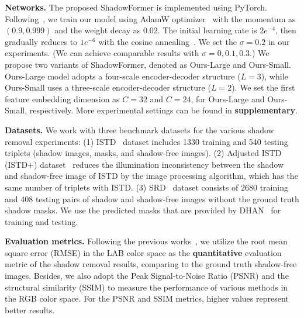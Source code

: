 \documentclass[letterpaper]{article} \usepackage{aaai23}  \usepackage{times}  \usepackage{helvet}  \usepackage{courier}  \usepackage[hyphens]{url}  \usepackage{graphicx} \urlstyle{rm} \def\UrlFont{\rm}  \usepackage{natbib}  \usepackage{caption} \frenchspacing  \setlength{\pdfpagewidth}{8.5in} \setlength{\pdfpageheight}{11in} \usepackage{algorithm}
\begin{document}
\noindent\textbf{Networks.}
The proposed ShadowFormer is implemented using PyTorch.
{Following~\cite{vaswani2017attention},  
we train our model using AdamW optimizer~\cite{loshchilov2017decoupled} with the momentum as $(0.9, 0.999)$ and the weight decay as $0.02$.}
{The initial learning rate is $2e^{-4}$, then gradually reduces to $1e^{-6}$ with the cosine annealing~\cite{loshchilov2016sgdr}.}
We set the $\sigma=0.2$ in our experiments. (We can achieve comparable results with $\sigma=0, 0.1, 0.3$.)
{We propose two variants of ShadowFormer, 
denoted as Ours-Large and Ours-Small.}
{Ours-Large model adopts a four-scale encoder-decoder structure ($L=3$), while Ours-Small uses a three-scale encoder-decoder structure ($L=2$).
}
We set the first feature embedding dimension as $C=32$ and $C=24$, for Ours-Large and Ours-Small, respectively.
More experimental settings can be found in \textbf{supplementary}.

\noindent\textbf{Datasets.} 
{We work with three benchmark datasets for the various shadow removal experiments: }
(1) ISTD~\cite{wang2018stacked} dataset includes 1330 training and 540 testing triplets (shadow images, masks, and shadow-free images).
(2) Adjusted ISTD (ISTD+) dataset~\cite{le2019shadow} reduces the illumination inconsistency between the shadow and shadow-free image of ISTD 
by the image processing algorithm, which has the same number of triplets with ISTD.
(3) SRD~\cite{qu2017deshadownet} dataset consists of 2680 training and 408 testing pairs of shadow and shadow-free images without the ground truth shadow masks.
We use the predicted masks that are provided by DHAN~\cite{cun2020towards} for training and testing.


\noindent\textbf{Evaluation metrics.} 
Following the previous works~\cite{wang2018stacked,guo2012paired,qu2017deshadownet,le2019shadow,cun2020towards,fu2021auto}, we utilize the root mean square error (RMSE) in the LAB color space as the \textbf{quantitative} evaluation metric of the shadow removal results, comparing to the ground truth shadow-free images.
Besides, we also adopt the Peak Signal-to-Noise Ratio (PSNR) and the structural similarity (SSIM) to measure the performance of various methods in the RGB color space. For the PSNR and SSIM metrics, higher values represent better results.
\end{document}
